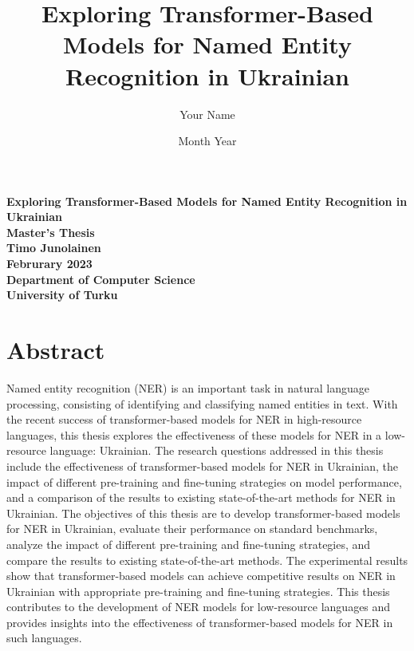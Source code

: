 \documentclass[a4paper,12pt]{report}
\title{Exploring Transformer-Based Models for Named Entity Recognition in Ukrainian}
\author{Your Name}
\date{Month Year}
\begin{document}
\begin{titlepage}
\centering
\vspace*{2cm}
{\Large\textbf{Exploring Transformer-Based Models for Named Entity Recognition in Ukrainian}}\\
\vspace{1cm}
{\large\textbf{Master's Thesis}}\\
\vspace{2cm}
{\large\textbf{Timo Junolainen}}\\
\vspace{1cm}
{\large\textbf{Februrary 2023}}\\
\vfill
{\large\textbf{Department of Computer Science}}\\
{\large\textbf{University of Turku}}\\
\end{titlepage}

\section*{Abstract}
Named entity recognition (NER)\cite{wiki:Named-entity_recognition} is an important task in natural language processing, consisting of identifying and classifying named entities in text. With the recent success of transformer-based models for NER in high-resource languages, this thesis explores the effectiveness of these models for NER in a low-resource\cite{lowresource} language: Ukrainian\cite{wiki:Ukrainian_language}. The research questions addressed in this thesis include the effectiveness of transformer-based models for NER in Ukrainian, the impact of different pre-training and fine-tuning strategies on model performance, and a comparison of the results to existing state-of-the-art methods for NER in Ukrainian. The objectives of this thesis are to develop transformer-based models for NER in Ukrainian, evaluate their performance on standard benchmarks, analyze the impact of different pre-training and fine-tuning strategies, and compare the results to existing state-of-the-art methods. The experimental results show that transformer-based models can achieve competitive results on NER in Ukrainian with appropriate pre-training and fine-tuning strategies. This thesis contributes to the development of NER models for low-resource languages and provides insights into the effectiveness of transformer-based models for NER in such languages.

\tableofcontents
\end{document}
